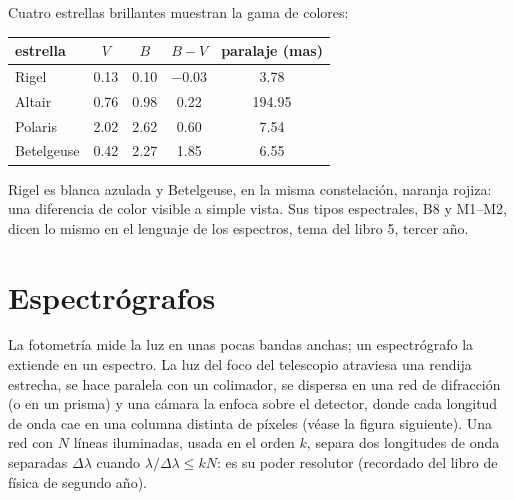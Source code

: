 Cuatro estrellas brillantes muestran la gama de colores:
\begin{center}
\small
\begin{tabular}{lcccc}
\hline
estrella & $V$ & $B$ & $B - V$ & paralaje (\unit{mas}) \\
\hline
Rigel & 0.13 & 0.10 & $-0.03$ & 3.78 \\
Altair & 0.76 & 0.98 & 0.22 & 194.95 \\
Polaris & 2.02 & 2.62 & 0.60 & 7.54 \\
Betelgeuse & 0.42 & 2.27 & 1.85 & 6.55 \\
\hline
\end{tabular}
\end{center}
Rigel es blanca azulada y Betelgeuse, en la misma constelación, naranja rojiza: una
diferencia de color visible a simple vista. Sus tipos espectrales, B8 y M1--M2, dicen lo
mismo en el lenguaje de los espectros, tema del libro 5, tercer año.

\section{Espectrógrafos}

La fotometría mide la luz en unas pocas bandas anchas; un espectrógrafo la extiende en un
espectro. La luz del foco del telescopio atraviesa una rendija estrecha, se hace paralela
con un colimador, se dispersa en una red de difracción (o en un prisma) y una cámara la
enfoca sobre el detector, donde cada longitud de onda cae en una columna distinta de
píxeles (véase la figura siguiente). Una red con $N$ líneas iluminadas, usada en el orden
$k$, separa dos longitudes de onda separadas $\Delta\lambda$ cuando $\lambda/\Delta\lambda \le kN$:
es su poder resolutor (recordado del libro de física de segundo año).

